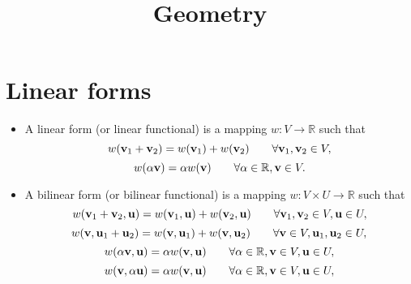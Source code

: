 \documentclass[11pt]{article}
\title{Geometry}
\begin{document}
\maketitle
\maketitle
\tableofcontents

\section{Linear forms}
\begin{itemize}

    \item A linear form (or linear functional) is a mapping $w:V \to \mathbb{R}$ such that
    \begin{equation}
        w(\mathbf{v}_1 + \mathbf{v}_2) = w(\mathbf{v}_1) + w(\mathbf{v}_2) \qquad \forall \mathbf{v}_1, \mathbf{v}_2 \in V,
    \end{equation}
    \begin{equation}
        w(\alpha \mathbf{v}) = \alpha w(\mathbf{v}) \qquad \forall \alpha \in \mathbb{R}, \mathbf{v} \in V.
    \end{equation}

    \item A bilinear form (or bilinear functional) is a mapping $w: V \times U \to \mathbb{R}$ such that
    \begin{equation}
        w(\mathbf{v}_1 + \mathbf{v}_2, \mathbf{u}) = w(\mathbf{v}_1, \mathbf{u}) + w(\mathbf{v}_2, \mathbf{u}) \qquad \forall \mathbf{v}_1, \mathbf{v}_2 \in V, \mathbf{u} \in U, 
    \end{equation}
    \begin{equation}
        w(\mathbf{v}, \mathbf{u}_1 + \mathbf{u}_2) = w(\mathbf{v}, \mathbf{u}_1) + w(\mathbf{v}, \mathbf{u}_2) \qquad \forall \mathbf{v} \in V, \mathbf{u}_1, \mathbf{u}_2 \in U, 
    \end{equation}
    \begin{equation}
        w(\alpha \mathbf{v}, \mathbf{u}) = \alpha w(\mathbf{v}, \mathbf{u}) \qquad \forall \alpha \in \mathbb{R}, \mathbf{v} \in V, \mathbf{u} \in U,
    \end{equation}
    \begin{equation}
        w(\mathbf{v}, \alpha \mathbf{u}) = \alpha w(\mathbf{v}, \mathbf{u}) \qquad \forall \alpha \in \mathbb{R}, \mathbf{v} \in V, \mathbf{u} \in U,
    \end{equation}


\end{itemize}
\end{document}
